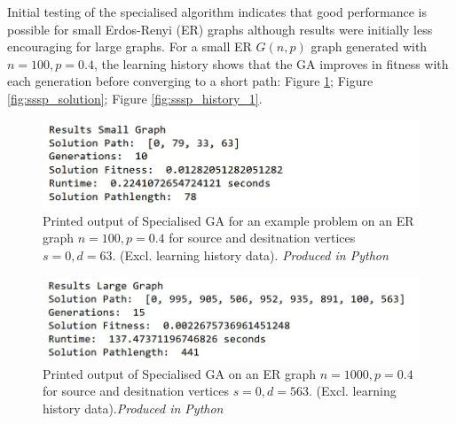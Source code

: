 \documentclass[
	a4paper, %
	10pt, %
	unnumberedsections, %
	twoside, %
]{LTJournalArticle}
\begin{document}
Initial testing of the specialised algorithm indicates that good performance is possible for small Erdos-Renyi (ER) graphs although results were initially less encouraging for large graphs. For a small ER \(G(n, p)\) graph generated with \(n = 100, p = 0.4\), the learning history shows that the GA improves in fitness with each generation before converging to a short path: Figure \ref{fig:sssp_result_small_1}; Figure \ref{fig:sssp_solution}; Figure \ref{fig:sssp_history_1}. 


\begin{figure}[H]
	\includegraphics[width=\linewidth]{Figures/sssp/result_small.jpg}
	\caption{Printed output of Specialised GA for an example problem on an ER graph \(n = 100, p = 0.4\) for source and desitnation vertices \(s = 0, d = 63\). (Excl. learning history data).  \emph{Produced in Python}}
	\label{fig:sssp_result_small_1}
\end{figure}

\begin{figure}[H]
	\includegraphics[width=\linewidth]{Figures/sssp/result_large.jpg}
	\caption{Printed output of Specialised GA on an ER graph \(n = 1000, p = 0.4\) for source and desitnation vertices \(s = 0, d = 563\). (Excl. learning history data).\emph{Produced in Python}}
	\label{fig:sssp_result_large}
\end{figure}
\end{document}

